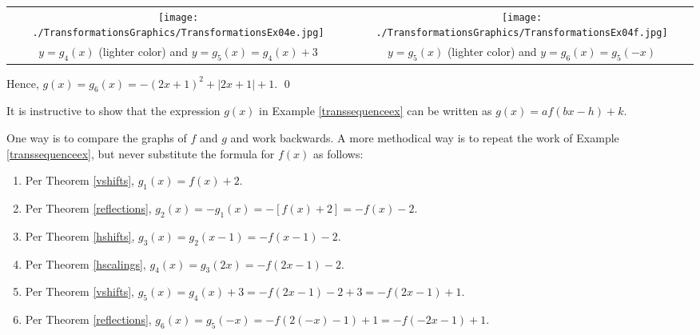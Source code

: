 \documentclass{ximera}
\begin{document}
\begin{example}
\begin{enumerate}
\begin{center}
\begin{tabular}{cc}

\texttt{[image: ./TransformationsGraphics/TransformationsEx04e.jpg]} & \texttt{[image: ./TransformationsGraphics/TransformationsEx04f.jpg]} \\

$y=g_{4}(x)$ (lighter color) and $y=g_{5}(x) = g_{4}(x)+3$ &  $y = g_{5}(x)$ (lighter color) and $y = g_{6}(x) = g_{5}(-x)$ \\

\end{tabular}

\end{center} 

\end{enumerate}

Hence, $g(x) = g_{6}(x) = -(2x+1)^2+|2x+1| + 1$.  \qed
 
\end{example}

It is instructive to show that the expression $g(x)$ in Example \ref{transsequenceex}  can be written as $g(x) = a f(bx-h)+k$.  

\smallskip

One way is to compare the graphs of $f$ and $g$ and work backwards.  A more methodical way is to repeat the work of Example \ref{transsequenceex}, but never substitute the formula for $f(x)$ as follows:


\begin{enumerate}

\item  Per Theorem \ref{vshifts}, $g_{1}(x) = f(x) + 2$.

\item  Per Theorem \ref{reflections}, $g_{2}(x) = -g_{1}(x) =  -[f(x) + 2] = -f(x)-2$.

\item  Per Theorem \ref{hshifts}, $g_{3}(x) = g_{2}(x-1) = -f(x-1)-2$.

\item  Per Theorem \ref{hscalings}, $g_{4}(x) = g_{3}(2x) =-f(2x-1)-2$.

\item  Per Theorem \ref{vshifts}, $g_{5}(x) = g_{4}(x)+3 = -f(2x-1)-2 + 3 = -f(2x-1)+1$.

\item  Per Theorem \ref{reflections}, $g_{6}(x) = g_{5}(-x) =  -f(2(-x)-1)+1 = -f(-2x-1)+1$.

\end{enumerate}
\end{document}
